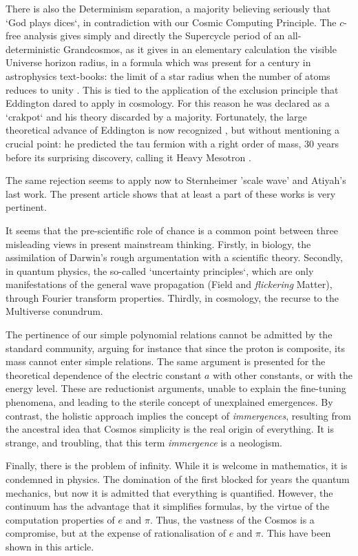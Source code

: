 \documentclass[twoside,draft]{article}
\begin{document}
\begin{sloppypar}
{There is also the Determinism separation, a majority believing seriously that `God plays dices`,
in contradiction with our Cosmic Computing Principle. The $c$-free analysis gives simply and
directly the Supercycle period of an all-deterministic Grandcosmos, as it gives in an elementary
calculation the visible Universe horizon radius, in a formula which was present for a century in
astrophysics text-books: the limit of a star radius when the number of atoms reduces to unity \cite{Sanchez1}.
This is tied to the application of the exclusion principle that Eddington dared to apply in
cosmology. For this reason he was declared as a `crakpot` and his theory discarded by a majority.
Fortunately, the large theoretical advance of Eddington is now recognized \cite{Larin,Durham}, but without
mentioning a crucial point: he predicted the tau fermion with a right order of mass, 30 years before its surprising discovery, calling it Heavy Mesotron \cite{Carr}.

The same rejection seems to apply now to Sternheimer 'scale wave' and Atiyah's last work. The present article shows that at least a part of these works is very pertinent.

It seems that the pre-scientific role of chance is a common point between three misleading views
in present mainstream thinking. Firstly, in biology, the assimilation of Darwin's rough argumentation
with a scientific theory. Secondly, in quantum physics, the so-called `uncertainty principles`, which are
only manifestations of the general wave propagation (Field and \textit{flickering} Matter), through Fourier
transform properties. Thirdly, in cosmology, the recurse to the Multiverse conundrum.

The pertinence of our simple polynomial relations cannot be admitted by the standard community, arguing for instance that since the proton is composite, its mass cannot enter simple relations. The same argument is presented for the theoretical dependence of the electric constant $a$ with other constants, or with the energy level. These are reductionist arguments, unable to explain the fine-tuning phenomena, and leading to the sterile concept of unexplained emergences. By contrast, the holistic approach implies the concept of \textit{immergences}, resulting from the ancestral idea that Cosmos simplicity is the real origin of everything. It is strange, and troubling, that this term \textit{immergence} is a neologism.

Finally, there is the problem of infinity. While it is welcome in mathematics, it is condemned in physics. The domination of the first blocked for years the quantum mechanics, but now it is admitted that everything is quantified. However, the continuum has the advantage that it simplifies formulas, by the virtue of the computation properties of $e$ and $\pi$. Thus, the vastness of the Cosmos is a compromise, but at the expense of rationalisation of $e$ and $\pi$. This have been shown in this article.

}
\end{sloppypar}
\end{document}
